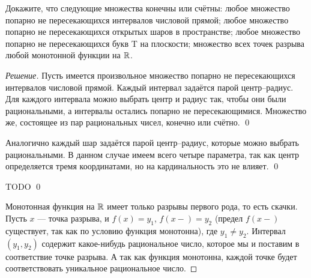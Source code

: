     \begin{problem}[4]
        Докажите, что следующие множества конечны или счётны: любое множество попарно не пересекающихся интервалов числовой прямой; любое множество попарно не пересекающихся открытых шаров в пространстве; любое множество попарно не пересекающихся букв T на плоскости; множество всех точек разрыва любой монотонной функции на \(\mathbb{R}\).
    \end{problem}
    \begin{proof}[Решение]
        Пусть имеется произвольное множество попарно не пересекающихся интервалов числовой прямой. Каждый интервал задаётся парой центр--радиус. Для каждого интервала можно выбрать центр и радиус так, чтобы они были рациональными, а интервалы остались попарно не пересекающимися. Множество же, состоящее из пар рациональных чисел, конечно или счётно. \qed

        Аналогично каждый шар задаётся парой центр--радиус, которые можно выбрать рациональными. В данном случае имеем всего четыре параметра, так как центр определяется тремя координатами, но на кардинальность это не влияет. \qed

        TODO  \qed

        Монотонная функция на \(\mathbb{R}\) имеет только разрывы первого рода, то есть скачки. Пусть \(x\) --- точка разрыва, и \(f(x) = y_1\), \(f(x-) = y_2\) (предел \(f(x-)\) существует, так как по условию функция монотонна), где \(y_1 \neq y_2\). Интервал \((y_1, y_2)\) содержит какое-нибудь рациональное число, которое мы и поставим в соответствие точке разрыва. А так как функция монотонна, каждой точке будет соответствовать уникальное рациональное число.
    \end{proof}

